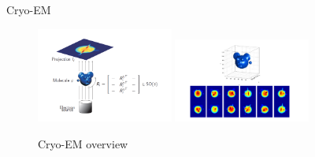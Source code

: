 \documentclass[aspectratio=169]{beamer}
\begin{document}
\begin{frame}[c]{Cryo-EM}
    \begin{figure}
        \includegraphics[width=0.4\textwidth]{cryo-EM-overview.png}
        \includegraphics[width=0.4\textwidth]{micky-mouse.png}
        \caption{Cryo-EM overview \cite[Figure 1 and Figure 2]{cryoEmMath2}}
    \end{figure}

\end{frame}
\end{document}
